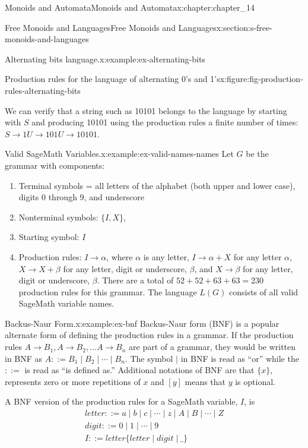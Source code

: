 \documentclass[oneside,10pt,]{book}
\numberwithin{equation}{section}
\begin{document}
\begin{chapterptx}{Monoids and Automata}{}{Monoids and Automata}{}{}{x:chapter:chapter_14}
\begin{sectionptx}{Free Monoids and Languages}{}{Free Monoids and Languages}{}{}{x:section:s-free-monoids-and-languages}
\begin{example}{Alternating bits language.}{x:example:ex-alternating-bits}
\begin{figureptx}{Production rules for the language of alternating 0's and 1's}{x:figure:fig-production-rules-alternating-bits}{}
\begin{image}{0.15}{0.7}{0.15}
\end{image}%
\tcblower
\end{figureptx}%
We can verify that a string such as 10101 belongs to the language by starting with \(S\) and producing 10101 using the production rules a finite number of times: \(S\to 1U\to 101U\to 10101\).%
\end{example}
\begin{example}{Valid SageMath Variables.}{x:example:ex-valid-names-names}%
Let \(G\) be the grammar with components:%
\begin{enumerate}[label=(\arabic*)]
\item{}Terminal symbols = all letters of the alphabet (both upper and lower case), digits 0 through 9, and underscore%
\item{}Nonterminal symbols: \(\{I, X\}\),%
\item{}Starting symbol: \(I\)%
\item{}Production rules: \(I \to \alpha\), where \(\alpha\) is any letter, \(I \to \alpha+X\) for any letter \(\alpha\), \(X\to X+\beta\) for any letter, digit or underscore, \(\beta\), and \(X \to \beta\) for any letter, digit or underscore, \(\beta\). There are a total of \(52+52+63+63=230\) production rules for this grammar. The language \(L(G)\) consists of all valid SageMath variable names.%
\end{enumerate}
%
\end{example}
\begin{example}{Backus-Naur Form.}{x:example:ex-bnf}%
Backus-Naur form (BNF) is a popular alternate form of defining the production rules in a grammar. If the production rules \(A\to B_1, A\to B_2,\ldots  A\to B_n\) are part of a grammar, they would be written in BNF as \(A ::=B_1 \mid B_2\mid  \cdots \mid  B_n\). The symbol \(\mid\) in BNF is read as ``or'' while the \(::=\) is read as ``is defined as.'' Additional notations of BNF are that \(\{x\}\), represents zero or more repetitions of \(x\) and \([y]\) means that \(y\) is optional.%
\par
A BNF version of the production rules for a SageMath variable, \(I\), is%
\begin{equation*}
\begin{array}{l}
letter ::=a \mid b \mid c \mid \cdots \mid z\mid A\mid  B\mid \cdots \mid Z\\
digit::=0 \mid 1 \mid \cdots  \mid 9\\
I::= letter\{letter  \mid  digit  \mid  \_\}\\
\\

\end{array}
\end{equation*}
\end{example}
\end{sectionptx}
\end{chapterptx}
\end{document}

